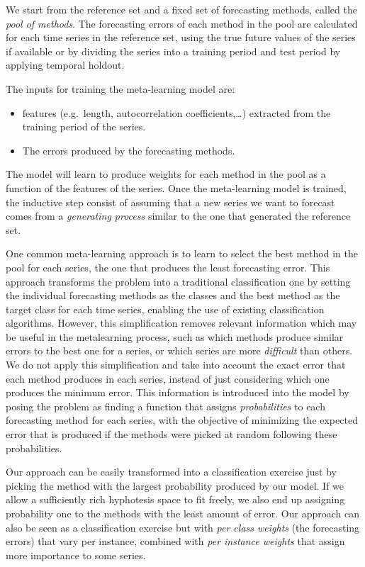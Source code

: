 \documentclass[11pt,a4paper,]{article}
\providecommand{\tightlist}{%
  \setlength{\itemsep}{0pt}\setlength{\parskip}{0pt}}
\theoremstyle{definition}
\theoremstyle{definition}
\theoremstyle{definition}
\theoremstyle{remark}
\begin{document}
We start from the reference set and a fixed set of forecasting methods,
called the \emph{pool of methods}. The forecasting errors of each method
in the pool are calculated for each time series in the reference set,
using the true future values of the series if available or by dividing
the series into a training period and test period by applying temporal
holdout.

The inputs for training the meta-learning model are:

\begin{itemize}
\tightlist
\item
  features (e.g.~length, autocorrelation coefficients,\ldots{})
  extracted from the training period of the series.
\item
  The errors produced by the forecasting methods.
\end{itemize}

The model will learn to produce weights for each method in the pool as a
function of the features of the series. Once the meta-learning model is
trained, the inductive step consist of assuming that a new series we
want to forecast comes from a \emph{generating process} similar to the
one that generated the reference set.

One common meta-learning approach is to learn to select the best method
in the pool for each series, the one that produces the least forecasting
error. This approach transforms the problem into a traditional
classification one by setting the individual forecasting methods as the
classes and the best method as the target class for each time series,
enabling the use of existing classification algorithms. However, this
simplification removes relevant information which may be useful in the
metalearning process, such as which methods produce similar errors to
the best one for a series, or which series are more \emph{difficult}
than others. We do not apply this simplification and take into account
the exact error that each method produces in each series, instead of
just considering which one produces the minimum error. This information
is introduced into the model by posing the problem as finding a function
that assigns \emph{probabilities} to each forecasting method for each
series, with the objective of minimizing the expected error that is
produced if the methods were picked at random following these
probabilities.

Our approach can be easily transformed into a classification exercise
just by picking the method with the largest probability produced by our
model. If we allow a sufficiently rich hyphotesis space to fit freely,
we also end up assigning probability one to the methods with the least
amount of error. Our approach can also be seen as a classification
exercise but with \emph{per class weights} (the forecasting errors) that
vary per instance, combined with \emph{per instance weights} that assign
more importance to some series.
\end{document}
